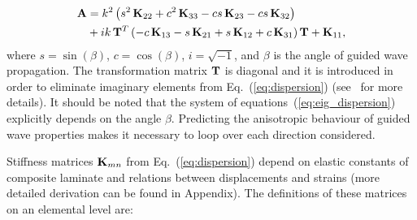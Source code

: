 	
\begin{equation}
	\begin{aligned}
	\mathbf{A} & =  k^2\left(s^2 \,\mathbf{K}_{22} + c^2\, \mathbf{K}_{33} - c s \, \mathbf{K}_{23} - c s\, \mathbf{K}_{32}\right) \\
	& + i k\, \mathbf{T}^T\left(-c\, \mathbf{K}_{13} - s \, \mathbf{K}_{21} + s \, \mathbf{K}_{12} + c \, \mathbf{K}_{31}\right) \mathbf{T} +\mathbf{K}_{11},
	\end{aligned}
\label{eq:dispersion}\end{equation}
where  \(s = \sin(\beta)\), \(c = \cos(\beta)\), \(i = \sqrt{-1}\), and \(\beta\) is the angle of guided wave propagation. 
The transformation matrix \(\mathbf{T}\) is diagonal and it is introduced in order to eliminate imaginary elements from Eq.~(\ref{eq:dispersion}) (see~\cite{Bartoli2006} for more details). 
It should be noted that the system of equations~(\ref{eq:eig_dispersion}) explicitly depends on the angle \(\beta\). 
Predicting the anisotropic behaviour of guided wave properties makes it necessary to loop over each direction considered.
	
Stiffness matrices \(\mathbf{K}_{mn}\) from Eq.~(\ref{eq:dispersion}) depend on elastic constants of composite laminate and relations between displacements and strains (more detailed derivation can be found in Appendix). 
The definitions of these matrices on an elemental level are:
	
